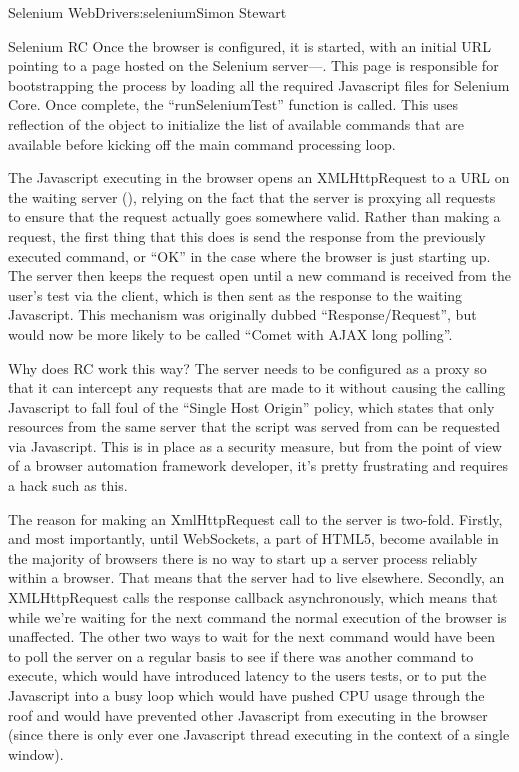 \begin{aosachapter}{Selenium WebDriver}{s:selenium}{Simon Stewart}
\begin{aosasect1}{Selenium RC}
Once the browser is configured, it is started, with an initial URL
pointing to a page hosted on the Selenium
server---. This page is responsible for
bootstrapping the process by loading all the required Javascript files
for Selenium Core. Once complete, the ``runSeleniumTest'' function is
called. This uses reflection of the  object to
initialize the list of available commands that are available before
kicking off the main command processing loop.

The Javascript executing in the browser opens an XMLHttpRequest to a
URL on the waiting server (), relying on
the fact that the server is proxying all requests to ensure that the
request actually goes somewhere valid. Rather than making a request,
the first thing that this does is send the response from the
previously executed command, or ``OK'' in the case where the browser
is just starting up. The server then keeps the request open until a
new command is received from the user's test via the client, which is
then sent as the response to the waiting Javascript.  This mechanism
was originally dubbed ``Response/Request'', but would now be more
likely to be called ``Comet with AJAX long polling''.

Why does RC work this way? The server needs to be configured as a
proxy so that it can intercept any requests that are made to it
without causing the calling Javascript to fall foul of the ``Single
Host Origin'' policy, which states that only resources from the same
server that the script was served from can be requested via
Javascript.  This is in place as a security measure, but from the
point of view of a browser automation framework developer, it's pretty
frustrating and requires a hack such as this.

The reason for making an XmlHttpRequest call to the server is
two-fold.  Firstly, and most importantly, until WebSockets, a part of
HTML5, become available in the majority of browsers there is no way to
start up a server process reliably within a browser.  That means that
the server had to live elsewhere. Secondly, an XMLHttpRequest calls
the response callback asynchronously, which means that while we're
waiting for the next command the normal execution of the browser is
unaffected. The other two ways to wait for the next command would have
been to poll the server on a regular basis to see if there was another
command to execute, which would have introduced latency to the users
tests, or to put the Javascript into a busy loop which would have
pushed CPU usage through the roof and would have prevented other
Javascript from executing in the browser (since there is only ever one
Javascript thread executing in the context of a single window).


\end{aosasect1}
\end{aosachapter}
